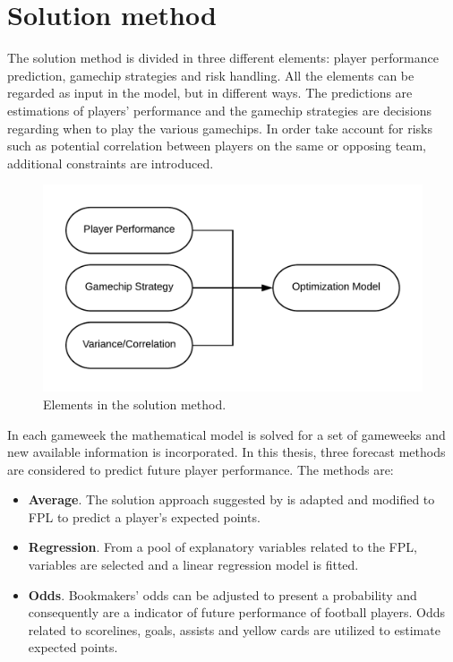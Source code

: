 \section{Solution method}

\newpar

The solution method is divided in three different elements: player performance prediction, gamechip strategies and risk handling. All the elements can be regarded as input in the model, but in different ways. The predictions are estimations of players' performance and the gamechip strategies are decisions regarding when to play the various gamechips. In order take account for risks such as potential correlation between players on the same or opposing team, additional constraints are introduced. 


\begin{figure}[H]
    \centering
    \includegraphics[scale = 0.65]{fig/chapter_5/Solution_Method.png}
    \caption{Elements in the solution method.}
    \label{fig:solution}
\end{figure}

\newpar

In each gameweek the mathematical model is solved for a set of gameweeks and new available information is incorporated. In this thesis, three forecast methods are considered to predict future player performance. The methods are: 
\begin{itemize}
    \item \textbf{Average}. The solution approach suggested by \cite{Bonomo} is adapted and modified to FPL to predict a player's expected points.
    \item \textbf{Regression}. From a pool of explanatory variables related to the FPL, variables are selected and a linear regression model is fitted. 
    \item \textbf{Odds}. Bookmakers' odds can be adjusted to present a probability and consequently are a indicator of future performance of football players. Odds related to scorelines, goals, assists and yellow cards are utilized to estimate expected points. 
\end{itemize}


